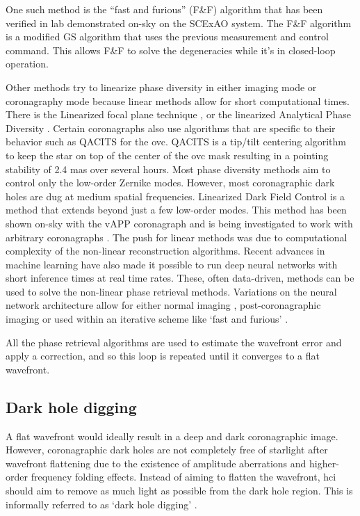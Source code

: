 \documentclass[letterpaper]{ar-1col}
\begin{document}
%
One such method is the ``fast and furious'' (F\&F) algorithm \citep{Keller12} that has been verified in lab \citep{Wilby18} demonstrated on-sky \citep{Bos20} on the SCExAO system.
%
The F\&F algorithm is a modified GS algorithm that uses the previous measurement and control command.
%
This allows F\&F to solve the degeneracies while it's in closed-loop operation.

%
Other methods try to linearize phase diversity in either imaging mode or coronagraphy mode because linear methods allow for short computational times.
%
There is the Linearized focal plane technique \citep[LIFT; ][]{meimon2010lift}, or the linearized Analytical Phase Diversity \citep[LAPD; ][]{vievard2020cophasing}.
%
Certain coronagraphs also use algorithms that are specific to their behavior such as QACITS \citep{huby2017sky} for the \ac{ovc}.
%
QACITS is a tip/tilt centering algorithm to keep the star on top of the center of the \ac{ovc} mask resulting in a pointing stability of 2.4 mas over several hours. 
%
Most phase diversity methods aim to control only the low-order Zernike modes.
%
However, most coronagraphic dark holes are dug at medium spatial frequencies.
%
Linearized Dark Field Control \citep[LDFC;][]{miller2017spatial} is a method that extends beyond just a few low-order modes.
%
This method has been shown on-sky with the vAPP coronagraph and is being investigated to work with arbitrary coronagraphs \citep{miller2019spatial,ahn2023combining}.
%
The push for linear methods was due to computational complexity of the non-linear reconstruction algorithms.
%
Recent advances in machine learning have also made it possible to run deep neural networks with short inference times at real time rates.
%
These, often data-driven, methods can be used to solve the non-linear phase retrieval methods.
%
Variations on the neural network architecture allow for either normal imaging \citep{orban2021focal, zhang2021phasegan}, post-coronagraphic imaging \citep{quesnel2022deep} or used within an iterative scheme like `fast and furious' \citep{bottom2023sequential}.

All the phase retrieval algorithms are used to estimate the wavefront error and apply a correction, and so this loop is repeated until it converges to a flat wavefront.

\subsection{Dark hole digging}

A flat wavefront would ideally result in a deep and dark coronagraphic image.
%
However, coronagraphic dark holes are not completely free of starlight after wavefront flattening due to the existence of amplitude aberrations and higher-order frequency folding effects.
%
Instead of aiming to flatten the wavefront, \ac{hci} should aim to remove as much light as possible from the dark hole region.
%
This is informally referred to as `dark hole digging' \citep{malbet1995high, borde2006high}.
\end{document}
